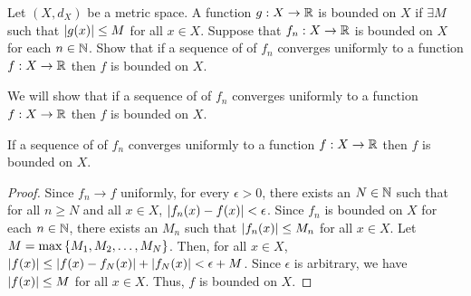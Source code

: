 \begin{problem}
  Let $(X, d_X)$ be a metric space.
  A function $g : X \to \mathbb{R}$ is bounded on $X$
  if $\exists M$ such that $\lvert g(x)\rvert \leq M$ for all $x \in X$.
  Suppose that $f_n : X \to \mathbb{R}$ is bounded on $X$ for each $n \in \mathbb{N}$.
  Show that if a sequence of of $f_n$ converges uniformly
  to a function $f : X \to \mathbb{R}$ then $f$ is bounded on $X$.
\end{problem}

\begin{answer}
  We will show that if a sequence of of $f_n$ converges uniformly
  to a function $f : X \to \mathbb{R}$ then $f$ is bounded on $X$.

  \begin{claim}
    If a sequence of of $f_n$ converges uniformly
    to a function $f : X \to \mathbb{R}$ then $f$ is bounded on $X$.
    \begin{proof}
      Since $f_n \to f$ uniformly, for every $\epsilon > 0$,
      there exists an $N \in \mathbb{N}$ such that for all $n \geq N$ and all $x \in X$,
      $\lvert f_n(x) - f(x)\rvert < \epsilon$.
      Since $f_n$ is bounded on $X$ for each $n \in \mathbb{N}$,
      there exists an $M_n$ such that $\lvert f_n(x)\rvert \leq M_n$ for all $x \in X$.
      Let $M = \max \left\{M_1, M_2, \ldots, M_N\right\}$.
      Then, for all $x \in X$, $\lvert f(x)\rvert \leq \lvert f(x) - f_N(x)\rvert + \lvert f_N(x)\rvert < \epsilon + M$.
      Since $\epsilon$ is arbitrary, we have $\lvert f(x)\rvert \leq M$ for all $x \in X$.
      Thus, $f$ is bounded on $X$.
    \end{proof}
  \end{claim}
\end{answer}
